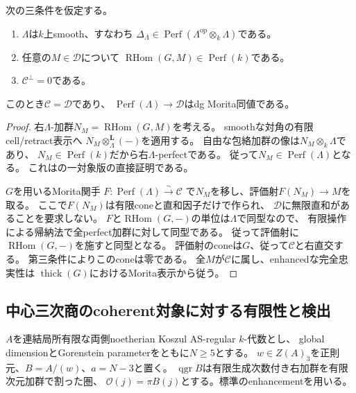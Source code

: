 \begin{theorem}[有限性とsmoothnessによる全体への飽和]
\label{crs:thm:abstract}
次の三条件を仮定する。
\begin{enumerate}
\item $\Lambda$は$k$上smooth、すなわち
$\Delta_\Lambda\in\operatorname{Perf}(\Lambda^{\mathrm{op}}\otimes_k\Lambda)$である。
\item 任意の$M\in\mathcal D$について
$\operatorname{RHom}(G,M)\in\operatorname{Perf}(k)$である。
\item $\mathcal C^\perp=0$である。
\end{enumerate}
このとき$\mathcal C=\mathcal D$であり、
$\operatorname{Perf}(\Lambda)\to\mathcal D$はdg Morita同値である。
\end{theorem}
\begin{proof}
右$\Lambda$-加群$N_M=\operatorname{RHom}(G,M)$を考える。
smoothな対角の有限cell/retract表示へ
$N_M\otimes_\Lambda^{\mathbf L}(-)$を適用する。
自由な包絡加群の像は$N_M\otimes_k\Lambda$であり、
$N_M\in\operatorname{Perf}(k)$だから右$\Lambda$-perfectである。
従って$N_M\in\operatorname{Perf}(\Lambda)$となる。
これは\cite[Lemma~2.8(2)]{ROGTV}の一対象版の直接証明である。

$G$を用いるMorita関手
$F:\operatorname{Perf}(\Lambda)\xrightarrow{\sim}\mathcal C$
で$N_M$を移し、評価射$F(N_M)\to M$を取る。
ここで$F(N_M)$は有限coneと直和因子だけで作られ、
$\mathcal D$に無限直和があることを要求しない。
$F$と$\operatorname{RHom}(G,-)$の単位は$\Lambda$で同型なので、
有限操作による帰納法で全perfect加群に対して同型である。
従って評価射に$\operatorname{RHom}(G,-)$を施すと同型となる。
評価射のconeは$G$、従って$\mathcal C$と右直交する。
第三条件によりこのconeは零である。
全$M$が$\mathcal C$に属し、enhancedな完全忠実性は
$\operatorname{thick}(G)$におけるMorita表示から従う。
\end{proof}

\subsection{中心三次商のcoherent対象に対する有限性と検出}

$A$を連結局所有限な両側noetherian Koszul AS-regular $k$-代数とし、
global dimensionとGorenstein parameterをともに$N\ge5$とする。
$w\in Z(A)_3$を正則元、$B=A/(w)$、$a=N-3$と置く。
$\operatorname{qgr}B$は有限生成次数付き右加群を有限次元加群で割った圏、
$\mathcal O(j)=\pi B(j)$とする。標準のenhancementを用いる。

